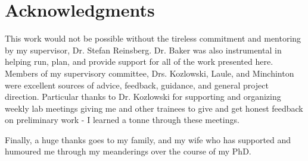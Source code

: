 
\chapter{Acknowledgments}

This work would not be possible without the tireless commitment and mentoring by my supervisor, Dr. Stefan Reinsberg.
Dr. Baker was also instrumental in helping run, plan, and provide support for all of the work presented here. 
Members of my supervisory committee, Drs. Kozlowski, Laule, and Minchinton were excellent sources of advice, feedback, guidance, and general project direction. 
Particular thanks to Dr. Kozlowski for supporting and organizing weekly lab meetings giving me and other trainees to give and get honest feedback on preliminary work - I learned a tonne through these meetings.

Finally, a huge thanks goes to my family, and my wife who has supported and humoured me through my meanderings over the course of my PhD. 